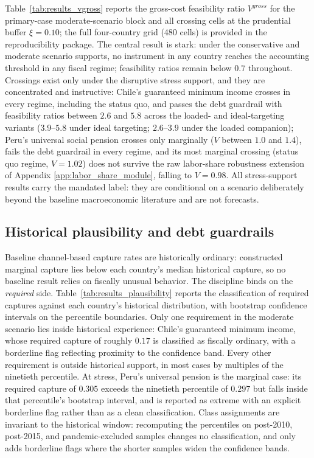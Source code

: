 \documentclass[11pt,a4paper]{article}
\begin{document}
Table~\ref{tab:results_vgross} reports the gross-cost feasibility ratio $V^{gross}$ for the
primary-case moderate-scenario block and all crossing cells at the prudential buffer
$\xi=0.10$; the full four-country grid (480 cells) is provided in the reproducibility package. The central
result is stark: under the conservative and moderate scenario supports, no instrument in any
country reaches the accounting threshold in any fiscal regime; feasibility ratios remain
below $0.7$ throughout. Crossings exist only under the disruptive stress support, and they
are concentrated and instructive: Chile's guaranteed minimum income crosses in every regime,
including the status quo, and passes the debt guardrail with feasibility ratios between
$2.6$ and $5.8$ across the loaded- and ideal-targeting variants ($3.9$--$5.8$ under ideal
targeting; $2.6$--$3.9$ under the loaded companion); Peru's universal social pension crosses only marginally ($V$ between $1.0$
and $1.4$), fails the debt guardrail in every regime, and its most marginal crossing (status quo regime, $V=1.02$) does not survive the raw labor-share robustness extension of Appendix \ref{app:labor_share_module}, falling to $V=0.98$. All stress-support results carry
the mandated label: they are conditional on a scenario deliberately beyond the baseline
macroeconomic literature and are not forecasts.



\subsection{Historical plausibility and debt guardrails}\label{subsec:results_plausibility}

Baseline channel-based capture rates are historically ordinary: constructed marginal capture lies below each country's median
historical capture, so no baseline result relies on fiscally unusual behavior. The
discipline binds on the \emph{required} side. Table~\ref{tab:results_plausibility} reports
the classification of required captures against each country's historical distribution,
with bootstrap confidence intervals on the percentile boundaries. Only one requirement in
the moderate scenario lies inside historical experience: Chile's guaranteed minimum income,
whose required capture of roughly $0.17$ is classified as fiscally ordinary, with a
borderline flag reflecting proximity to the confidence band. Every other requirement is
outside historical support, in most cases by multiples of the ninetieth percentile. At stress, Peru's
universal pension is the marginal case: its required capture of
$0.305$ exceeds the ninetieth percentile of $0.297$ but falls inside that percentile's
bootstrap interval, and is reported as extreme with an explicit borderline flag rather than
as a clean classification. Class assignments are invariant to the historical window:
recomputing the percentiles on post-2010, post-2015, and pandemic-excluded samples changes
no classification, and only adds borderline flags where the shorter samples widen the
confidence bands.
\end{document}
